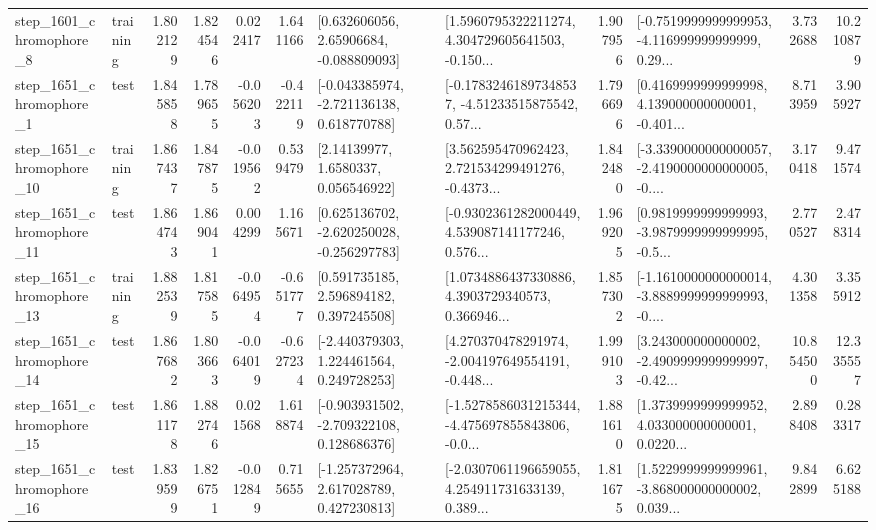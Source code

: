 \begin{tabular}{llrrrrllrlrr}
  step\_1601\_chromophore\_8 &  training &      1.802129 &    1.824546 &      0.022417 &  1.641166 &     [0.632606056, 2.65906684, -0.088809093] &  [1.5960795322211274, 4.304729605641503, -0.150... &       1.907956 &  [-0.7519999999999953, -4.116999999999999, 0.29... &            3.732688 &         10.210879 \\
  step\_1651\_chromophore\_1 &      test &      1.845858 &    1.789655 &     -0.056203 & -0.422119 &   [-0.043385974, -2.721136138, 0.618770788] &  [-0.17832461897348537, -4.51233515875542, 0.57... &       1.796696 &  [0.4169999999999998, 4.139000000000001, -0.401... &            8.713959 &          3.905927 \\
 step\_1651\_chromophore\_10 &  training &      1.867437 &    1.847875 &     -0.019562 &  0.539479 &        [2.14139977, 1.6580337, 0.056546922] &  [3.562595470962423, 2.721534299491276, -0.4373... &       1.842480 &  [-3.3390000000000057, -2.4190000000000005, -0.... &            3.170418 &          9.471574 \\
 step\_1651\_chromophore\_11 &      test &      1.864743 &    1.869041 &      0.004299 &  1.165671 &   [0.625136702, -2.620250028, -0.256297783] &  [-0.9302361282000449, 4.539087141177246, 0.576... &       1.969205 &  [0.9819999999999993, -3.9879999999999995, -0.5... &            2.770527 &          2.478314 \\
 step\_1651\_chromophore\_13 &  training &      1.882539 &    1.817585 &     -0.064954 & -0.651777 &     [0.591735185, 2.596894182, 0.397245508] &  [1.0734886437330886, 4.3903729340573, 0.366946... &       1.857302 &  [-1.1610000000000014, -3.8889999999999993, -0.... &            4.301358 &          3.355912 \\
 step\_1651\_chromophore\_14 &      test &      1.867682 &    1.803663 &     -0.064019 & -0.627234 &    [-2.440379303, 1.224461564, 0.249728253] &  [4.270370478291974, -2.004197649554191, -0.448... &       1.999103 &  [3.243000000000002, -2.4909999999999997, -0.42... &           10.854500 &         12.335557 \\
 step\_1651\_chromophore\_15 &      test &      1.861178 &    1.882746 &      0.021568 &  1.618874 &   [-0.903931502, -2.709322108, 0.128686376] &  [-1.5278586031215344, -4.475697855843806, -0.0... &       1.881610 &  [1.3739999999999952, 4.033000000000001, 0.0220... &            2.898408 &          0.283317 \\
 step\_1651\_chromophore\_16 &      test &      1.839599 &    1.826751 &     -0.012849 &  0.715655 &    [-1.257372964, 2.617028789, 0.427230813] &  [-2.0307061196659055, 4.254911731633139, 0.389... &       1.811675 &  [1.5229999999999961, -3.868000000000002, 0.039... &            9.842899 &          6.625188 \\

\end{tabular}
